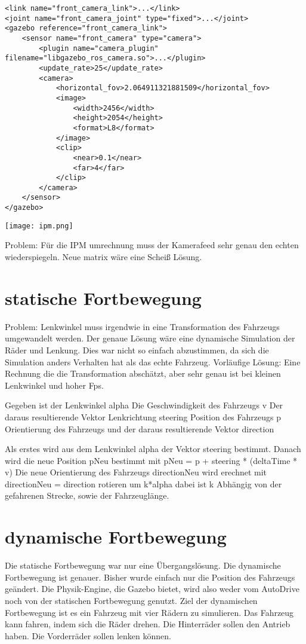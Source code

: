 \begin{lstlisting}
<link name="front_camera_link">...</link>
<joint name="front_camera_joint" type="fixed">...</joint>
<gazebo reference="front_camera_link">
    <sensor name="front_camera" type="camera">
        <plugin name="camera_plugin" filename="libgazebo_ros_camera.so">...</plugin>
        <update_rate>25</update_rate>
        <camera>
            <horizontal_fov>2.064911321881509</horizontal_fov>
            <image>
                <width>2456</width>
                <height>2054</height>
                <format>L8</format>
            </image>
            <clip>
                <near>0.1</near>
                <far>4</far>
            </clip>
        </camera>
    </sensor>
</gazebo>
\end{lstlisting}
\begin{center}
    \texttt{[image: ipm.png]}
\end{center}
Problem: Für die IPM umrechnung muss der Kamerafeed sehr genau den echten wiederspiegeln.
Neue matrix wäre eine Scheiß Lösung.



\section{statische Fortbewegung}
Problem: Lenkwinkel muss irgendwie in eine Transformation des Fahrzeugs umgewandelt werden.
Der genaue Lösung wäre eine dynamische Simulation der Räder und Lenkung.
Dies war nicht so einfach abzustimmen, da sich die Simulation anders Verhalten hat als das echte Fahrzeug.
Vorläufige Lösung: Eine Rechnung die die Transformation abschätzt, aber sehr genau ist bei kleinen Lenkwinkel und hoher Fps.

Gegeben ist der Lenkwinkel alpha
Die Geschwindigkeit des Fahrzeugs v
Der daraus resultierende Vektor Lenkrichtung steering
Position des Fahrzeugs p
Orientierung des Fahrzeugs und der daraus resultierende Vektor direction

Als erstes wird aus dem Lenkwinkel alpha der Vektor steering bestimmt.
Danach wird die neue Position pNeu bestimmt mit pNeu = p + steering * (deltaTime * v)
Die neue Orientierung des Fahrzeugs directionNeu wird erechnet mit directionNeu = direction rotieren um k*alpha
dabei ist k Abhängig von der gefahrenen Strecke, sowie der Fahrzeuglänge.

\section{dynamische Fortbewegung}
Die statische Fortbewegung war nur eine Übergangslösung.
Die dynamische Fortbewegung ist genauer. Bisher wurde einfach nur die Position des Fahrzeugs geändert.
Die Physik-Engine, die Gazebo bietet, wird also weder vom AutoDrive noch von der statischen Fortbewegung genutzt.
Ziel der dynamischen Fortbewegung ist es ein Fahrzeug mit vier Rädern zu simulieren.
Das Fahrzeug kann fahren, indem sich die Räder drehen.
Die Hinterräder sollen den Antrieb haben.
Die Vorderräder sollen lenken können.


